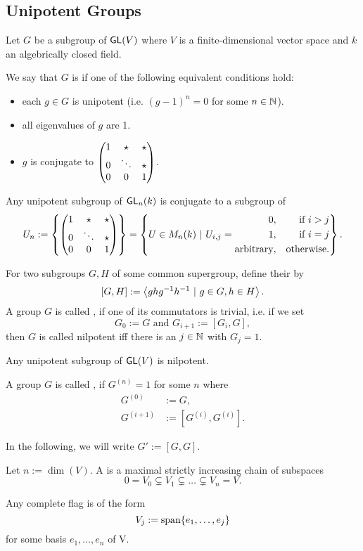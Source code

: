 \newpage
\subsection{Unipotent Groups}
Let $G$ be a subgroup of $\textsf{GL}(V)$ where $V$ is a finite-dimensional vector space and $k$ an algebrically closed field.
\begin{definition}
We say that $G$ is  if one of the following equivalent conditions hold:
\begin{itemize}
	\item each $g \in G$ is unipotent (i.e. $(g-1)^n = 0$ for some $n \in \mathbb{N}$).
	\item all eigenvalues of $g$ are 1.
	\item $g$ is conjugate to $\left(\begin{matrix} 1 & \star & \star\\ 0 & \ddots & \star \\ 0 & 0 & 1 \end{matrix}\right)$.
\end{itemize}
\end{definition}
\begin{theorem}
	Any unipotent subgroup of $\textsf{GL}_n(k)$ is conjugate to a subgroup of
	\[ U_n := \left\lbrace
	\left(\begin{matrix} 1 & \star & \star\\ 0 & \ddots & \star \\ 0 & 0 & 1 \end{matrix}\right)
	 \right\rbrace = \left\lbrace U\in M_n(k)  ~ | ~  U_{i,j} = \begin{aligned}
		0, && \text{if } i > j\\
		1, &&\text{if } i = j\\
		\text{arbitrary}, && \text{otherwise}.
		\end{aligned} \right\rbrace. \]
\end{theorem}
\begin{definition}
	For two subgroups $G,H$ of some common supergroup, define their  by
	\[ [G,H] := \left< ghg^{-1} h^{-1} ~|~ g \in G, h \in H \right>. \]
	A group $G$ is called , if one of its commutators is trivial, i.e. if we set
	\[ G_0 := G \text{  and  } G_{i+1} := [G_i, G], \]
	then $G$ is called nilpotent iff there is an $j\in \mathbb{N}$ with $G_j = 1$.
\end{definition}
\begin{corollary}
Any unipotent subgroup of $\textsf{GL}(V)$ is nilpotent.
\end{corollary}
\begin{definition}
A group $G$ is called , if $G^{(n)} = 1$ for some $n$ where
\begin{align*}
G^{(0)} &:= G,\\
G^{(i+1)} &:= [G^{(i)}, G^{(i)}].
\end{align*}
\end{definition}
\begin{notation}
In the following, we will write $G' := [G,G]$.
\end{notation}
\begin{definition}
Let $n := \dim (V)$. A  is a maximal strictly increasing chain of subspaces
\[ 0 = V_0 \subsetneq V_1 \subsetneq \ldots \subsetneq V_n = V. \]
\end{definition}
Any complete flag is of the form
\[ V_j := \mathrm{span} \{ e_1, \ldots, e_j\} \]
for some basis $e_1, \ldots, e_n$ of V.


